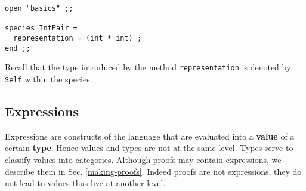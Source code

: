  {\scriptsize
\begin{lstlisting}
open "basics" ;;

species IntPair =
  representation = (int * int) ;
end ;;
\end{lstlisting}}

Recall that the type introduced by the method {\tt representation} is
denoted by {\tt Self} within the species.

\vspace{0.2cm}
\begin{syn}
 \is {} 
\end{syn}

\vspace{0.2cm}


\subsection{Expressions}
\label{expressions}
 Expressions are constructs of the language that are
evaluated into a {\bf value} of a certain {\bf type}. Hence values and
types are not at the same level. Types serve to classify values into
categories.  Although proofs may contain expressions, we describe them
in Sec. \ref{making-proofs}. Indeed proofs are not expressions, they do
not lead to {\focal} values thus live at another level.

